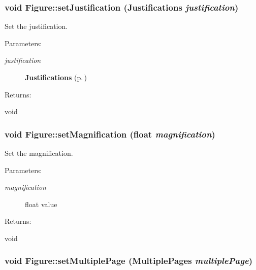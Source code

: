 \subsubsection{\setlength{\rightskip}{0pt plus 5cm}void Figure::set\-Justification ({\bf Justifications} {\em justification})\hspace{0.3cm}{\tt  [inline]}}\label{classFigure_a3}


Set the justification. \begin{Desc}
\item[Parameters: ]\par
\begin{description}
\item[{\em 
justification}]{\bf Justifications} {\rm (p.\,\pageref{classFigure_s24})} \end{description}
\end{Desc}
\begin{Desc}
\item[Returns: ]\par
void \end{Desc}
\subsubsection{\setlength{\rightskip}{0pt plus 5cm}void Figure::set\-Magnification (float {\em magnification})\hspace{0.3cm}{\tt  [inline]}}\label{classFigure_a6}


Set the magnification. \begin{Desc}
\item[Parameters: ]\par
\begin{description}
\item[{\em 
magnification}]float value \end{description}
\end{Desc}
\begin{Desc}
\item[Returns: ]\par
void \end{Desc}
\subsubsection{\setlength{\rightskip}{0pt plus 5cm}void Figure::set\-Multiple\-Page ({\bf Multiple\-Pages} {\em multiple\-Page})\hspace{0.3cm}{\tt  [inline]}}\label{classFigure_a7}


